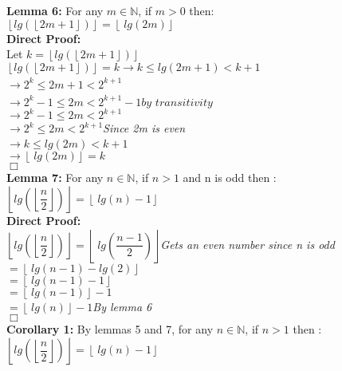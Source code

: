 \documentclass[12pt]{article}%
\begin{document}
\begin{enumerate}[label=(\alph*)]
\textbf{Lemma 6:} For any $m \in  \mathbb{N}$, if $m > 0$ then:\\
$\left\lfloor lg(\left\lfloor 2m+1 \right\rfloor)\right\rfloor = \left\lfloor\ lg(2m)\right\rfloor$\\
\textbf{Direct Proof:}\\
Let $k = \left\lfloor lg(\left\lfloor 2m+1 \right\rfloor)\right\rfloor$\\
$\left\lfloor lg(\left\lfloor 2m+1 \right\rfloor)\right\rfloor = k \xrightarrow[]{} k \leq lg(2m + 1) < k + 1$\\
$\xrightarrow[]{} 2^k \leq 2m+1 < 2^{k+1}$\\
$\xrightarrow{} 2^{k} -1 \leq 2m < 2^{k+1} -1 \textit{by transitivity}$\\
$\xrightarrow{} 2^k -1 \leq 2m < 2^{k+1}$\\
$\xrightarrow[]{} 2^k \leq 2m < 2^{k+1}$\textit{Since 2m is even}\\
$\xrightarrow{} k \leq lg(2m) < k + 1$\\
$\xrightarrow{}\left\lfloor\ lg(2m)\right\rfloor = k$\\
$\Box$\\


\textbf{Lemma 7:} For any $n \in  \mathbb{N}$, if $n > 1$ and n is odd then :\\
$\left\lfloor lg(\left\lfloor\dfrac{n}{2}\right\rfloor)\right\rfloor = \left\lfloor\ lg(n) -1\right\rfloor$\\
\textbf{Direct Proof:}\\
$\left\lfloor lg(\left\lfloor\dfrac{n}{2}\right\rfloor)\right\rfloor = \left\lfloor\ lg(\dfrac{n-1}{2})\right\rfloor$\textit{Gets an even number since n is odd}\\
$= \left\lfloor\ lg(n-1) - lg(2)\right\rfloor$\\
$= \left\lfloor\ lg(n-1) - 1\right\rfloor$\\
$= \left\lfloor\ lg(n-1)\right\rfloor -1$\\
$= \left\lfloor\ lg(n)\right\rfloor -1$\textit{By lemma 6}\\
$\Box$\\

\textbf{Corollary 1:}
By lemmas 5 and 7, for any $n \in  \mathbb{N}$, if $n > 1$ then :\\
$\left\lfloor lg(\left\lfloor\dfrac{n}{2}\right\rfloor)\right\rfloor = \left\lfloor\ lg(n) -1\right\rfloor$\\



\end{enumerate}
\end{document}
